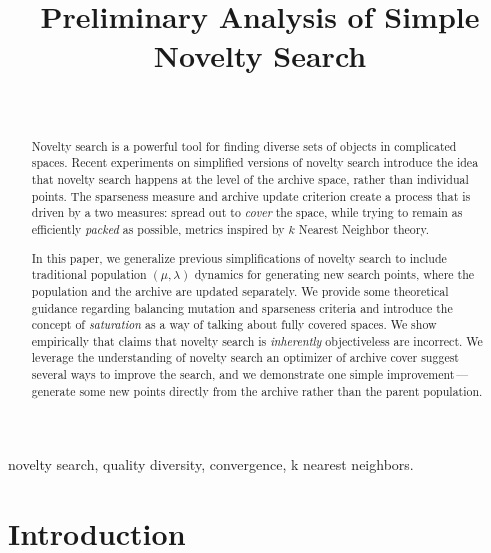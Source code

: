 \documentclass[twoside]{article}
\begin{document}
\title{\bf Preliminary Analysis of Simple Novelty Search}  

\author{ \hfill {}\\ 
}

\maketitle

\begin{abstract}
Novelty search is a powerful tool for finding diverse sets of objects in complicated spaces.  Recent experiments on simplified versions of novelty search introduce the idea that novelty search happens at the level of the archive space, rather than individual points.  The sparseness measure and archive update criterion create a process that is driven by a two measures:  spread out to \emph{cover} the space, while trying to remain as efficiently \emph{packed} as possible, metrics inspired by $k$ Nearest Neighbor theory.  

In this paper, we generalize previous simplifications of novelty search to include traditional population  $(\mu, \lambda)$ dynamics for generating new search points, where the population and the archive are updated separately.  We provide some theoretical guidance regarding balancing mutation and sparseness criteria and introduce the concept of \emph{saturation} as a way of talking about fully covered spaces.  We show empirically that claims that novelty search is \emph{inherently} objectiveless are incorrect.  We leverage the understanding of novelty search an optimizer of archive cover suggest several ways to improve the search, and we demonstrate one simple improvement\,---\,generate some new points directly from the archive rather than the parent population.
\end{abstract}

\begin{keywords}
novelty search, 
quality diversity,
convergence,
k nearest neighbors.
\end{keywords}

\section{Introduction}
\label{sec:introduction}
\end{document}
